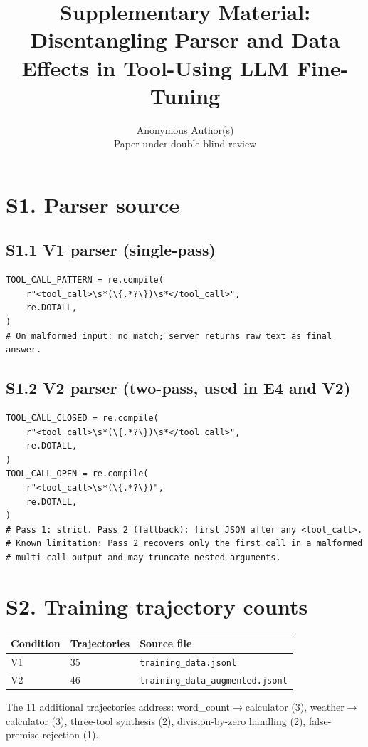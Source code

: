 \documentclass[11pt]{article}
\title{Supplementary Material: Disentangling Parser and Data Effects in Tool-Using LLM Fine-Tuning}
\author{Anonymous Author(s)\\ \small Paper under double-blind review}
\date{}
\begin{document}
\maketitle

\section*{S1. Parser source}

\subsection*{S1.1 V1 parser (single-pass)}
\begin{lstlisting}
TOOL_CALL_PATTERN = re.compile(
    r"<tool_call>\s*(\{.*?\})\s*</tool_call>",
    re.DOTALL,
)
# On malformed input: no match; server returns raw text as final answer.
\end{lstlisting}

\subsection*{S1.2 V2 parser (two-pass, used in E4 and V2)}
\begin{lstlisting}
TOOL_CALL_CLOSED = re.compile(
    r"<tool_call>\s*(\{.*?\})\s*</tool_call>",
    re.DOTALL,
)
TOOL_CALL_OPEN = re.compile(
    r"<tool_call>\s*(\{.*?\})",
    re.DOTALL,
)
# Pass 1: strict. Pass 2 (fallback): first JSON after any <tool_call>.
# Known limitation: Pass 2 recovers only the first call in a malformed
# multi-call output and may truncate nested arguments.
\end{lstlisting}

\section*{S2. Training trajectory counts}
\begin{tabular}{lll}
\toprule
Condition & Trajectories & Source file \\
\midrule
V1 & 35 & \texttt{training\_data.jsonl} \\
V2 & 46 & \texttt{training\_data\_augmented.jsonl} \\
\bottomrule
\end{tabular}

\noindent The 11 additional trajectories address: word\_count$\to$calculator (3), weather$\to$calculator (3), three-tool synthesis (2), division-by-zero handling (2), false-premise rejection (1).
\end{document}
